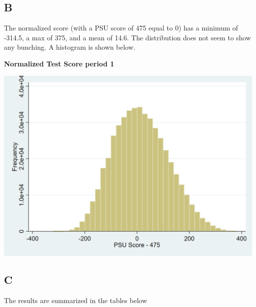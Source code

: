 \documentclass[11pt]{article}
\begin{document}
\subsection{B} 
The normalized score (with a PSU score of 475 equal to 0) has a minimum of -314.5, a max of 375, and a mean of 14.6. The distribution does not seem to show any bunching. A histogram is shown below. 


\begin{center}
	
	\centering
	\textbf{Normalized Test Score period 1 }\par\medskip
	\includegraphics[width=1\linewidth]{2b_hist.png}
\end{center}

\subsection{C } 

The results are summarized in the tables below 

 \begin{center}
 	\begin{tabular}{c | c | c|c} 
 		\hline
 		
 		\hline
 		
 	\end{tabular}
 \end{center}
 

 \begin{center}
	\begin{tabular}{c | c | c|c} 
		\hline
		
		\hline
		
	\end{tabular}
\end{center}
\end{document}
